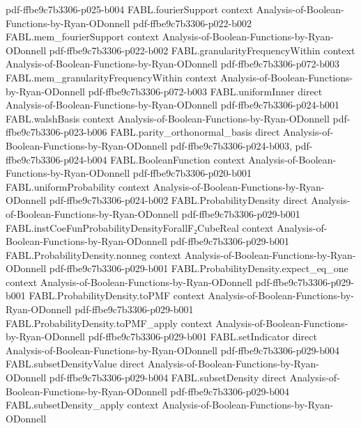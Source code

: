 \begin{theorem}
  {pdf-ffbe9c7b3306-p025-b004}
\proofstep
  {FABL.fourierSupport}
  {context}
  {Analysis-of-Boolean-Functions-by-Ryan-ODonnell}
  {pdf-ffbe9c7b3306-p022-b002}
\proofstep
  {FABL.mem_fourierSupport}
  {context}
  {Analysis-of-Boolean-Functions-by-Ryan-ODonnell}
  {pdf-ffbe9c7b3306-p022-b002}
\proofstep
  {FABL.granularityFrequencyWithin}
  {context}
  {Analysis-of-Boolean-Functions-by-Ryan-ODonnell}
  {pdf-ffbe9c7b3306-p072-b003}
\proofstep
  {FABL.mem_granularityFrequencyWithin}
  {context}
  {Analysis-of-Boolean-Functions-by-Ryan-ODonnell}
  {pdf-ffbe9c7b3306-p072-b003}
\proofstep
  {FABL.uniformInner}
  {direct}
  {Analysis-of-Boolean-Functions-by-Ryan-ODonnell}
  {pdf-ffbe9c7b3306-p024-b001}
\proofstep
  {FABL.walshBasis}
  {context}
  {Analysis-of-Boolean-Functions-by-Ryan-ODonnell}
  {pdf-ffbe9c7b3306-p023-b006}
\proofstep
  {FABL.parity_orthonormal_basis}
  {direct}
  {Analysis-of-Boolean-Functions-by-Ryan-ODonnell}
  {pdf-ffbe9c7b3306-p024-b003,
    pdf-ffbe9c7b3306-p024-b004}
\proofstep
  {FABL.BooleanFunction}
  {context}
  {Analysis-of-Boolean-Functions-by-Ryan-ODonnell}
  {pdf-ffbe9c7b3306-p020-b001}
\proofstep
  {FABL.uniformProbability}
  {context}
  {Analysis-of-Boolean-Functions-by-Ryan-ODonnell}
  {pdf-ffbe9c7b3306-p024-b002}
\proofstep
  {FABL.ProbabilityDensity}
  {direct}
  {Analysis-of-Boolean-Functions-by-Ryan-ODonnell}
  {pdf-ffbe9c7b3306-p029-b001}
\proofstep
  {FABL.instCoeFunProbabilityDensityForallF₂CubeReal}
  {context}
  {Analysis-of-Boolean-Functions-by-Ryan-ODonnell}
  {pdf-ffbe9c7b3306-p029-b001}
\proofstep
  {FABL.ProbabilityDensity.nonneg}
  {context}
  {Analysis-of-Boolean-Functions-by-Ryan-ODonnell}
  {pdf-ffbe9c7b3306-p029-b001}
\proofstep
  {FABL.ProbabilityDensity.expect_eq_one}
  {context}
  {Analysis-of-Boolean-Functions-by-Ryan-ODonnell}
  {pdf-ffbe9c7b3306-p029-b001}
\proofstep
  {FABL.ProbabilityDensity.toPMF}
  {context}
  {Analysis-of-Boolean-Functions-by-Ryan-ODonnell}
  {pdf-ffbe9c7b3306-p029-b001}
\proofstep
  {FABL.ProbabilityDensity.toPMF_apply}
  {context}
  {Analysis-of-Boolean-Functions-by-Ryan-ODonnell}
  {pdf-ffbe9c7b3306-p029-b001}
\proofstep
  {FABL.setIndicator}
  {direct}
  {Analysis-of-Boolean-Functions-by-Ryan-ODonnell}
  {pdf-ffbe9c7b3306-p029-b004}
\proofstep
  {FABL.subsetDensityValue}
  {direct}
  {Analysis-of-Boolean-Functions-by-Ryan-ODonnell}
  {pdf-ffbe9c7b3306-p029-b004}
\proofstep
  {FABL.subsetDensity}
  {direct}
  {Analysis-of-Boolean-Functions-by-Ryan-ODonnell}
  {pdf-ffbe9c7b3306-p029-b004}
\proofstep
  {FABL.subsetDensity_apply}
  {context}
  {Analysis-of-Boolean-Functions-by-Ryan-ODonnell}

\end{theorem}
